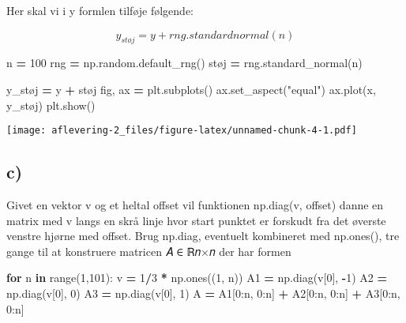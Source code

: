 \documentclass[
]{article}
\newenvironment{Shaded}{\begin{snugshade}}{\end{snugshade}}
\newcommand{\BuiltInTok}[1]{#1}
\newcommand{\ControlFlowTok}[1]{\textcolor[rgb]{0.13,0.29,0.53}{\textbf{#1}}}
\newcommand{\DecValTok}[1]{\textcolor[rgb]{0.00,0.00,0.81}{#1}}
\newcommand{\KeywordTok}[1]{\textcolor[rgb]{0.13,0.29,0.53}{\textbf{#1}}}
\newcommand{\NormalTok}[1]{#1}
\newcommand{\OperatorTok}[1]{\textcolor[rgb]{0.81,0.36,0.00}{\textbf{#1}}}
\newcommand{\StringTok}[1]{\textcolor[rgb]{0.31,0.60,0.02}{#1}}
\begin{document}
Her skal vi i y formlen tilføje følgende:

\[
y_{støj} = y + rng.standardnormal(n)
\]

\begin{Shaded}
\begin{Highlighting}[]
\NormalTok{n }\OperatorTok{=} \DecValTok{100}
\NormalTok{rng }\OperatorTok{=}\NormalTok{ np.random.default\_rng()}
\NormalTok{støj }\OperatorTok{=}\NormalTok{ rng.standard\_normal(n)}
\end{Highlighting}
\end{Shaded}

\begin{Shaded}
\begin{Highlighting}[]
\NormalTok{y\_støj }\OperatorTok{=}\NormalTok{ y }\OperatorTok{+}\NormalTok{ støj}
\NormalTok{fig, ax }\OperatorTok{=}\NormalTok{ plt.subplots()}
\NormalTok{ax.set\_aspect(}\StringTok{"equal"}\NormalTok{)}
\NormalTok{ax.plot(x, y\_støj)}
\NormalTok{plt.show()}
\end{Highlighting}
\end{Shaded}

\texttt{[image: aflevering-2\_files/figure-latex/unnamed-chunk-4-1.pdf]}

\hypertarget{c}{%
\subsection{c)}\label{c}}

Givet en vektor v og et heltal offset vil funktionen np.diag(v, offset)
danne en matrix med v langs en skrå linje hvor start punktet er forskudt
fra det øverste venstre hjørne med offset. Brug np.diag, eventuelt
kombineret med np.ones(), tre gange til at konstruere matricen 𝐴 ∈ ℝ𝑛×𝑛
der har formen

\begin{Shaded}
\begin{Highlighting}[]
\ControlFlowTok{for}\NormalTok{ n }\KeywordTok{in} \BuiltInTok{range}\NormalTok{(}\DecValTok{1}\NormalTok{,}\DecValTok{101}\NormalTok{):}
\NormalTok{  v }\OperatorTok{=} \DecValTok{1}\OperatorTok{/}\DecValTok{3} \OperatorTok{*}\NormalTok{ np.ones((}\DecValTok{1}\NormalTok{, n))}
\NormalTok{  A1 }\OperatorTok{=}\NormalTok{ np.diag(v[}\DecValTok{0}\NormalTok{], }\OperatorTok{{-}}\DecValTok{1}\NormalTok{) }
\NormalTok{  A2 }\OperatorTok{=}\NormalTok{ np.diag(v[}\DecValTok{0}\NormalTok{], }\DecValTok{0}\NormalTok{)}
\NormalTok{  A3 }\OperatorTok{=}\NormalTok{  np.diag(v[}\DecValTok{0}\NormalTok{], }\DecValTok{1}\NormalTok{)}
\NormalTok{  A }\OperatorTok{=}\NormalTok{ A1[}\DecValTok{0}\NormalTok{:n, }\DecValTok{0}\NormalTok{:n] }\OperatorTok{+}\NormalTok{ A2[}\DecValTok{0}\NormalTok{:n, }\DecValTok{0}\NormalTok{:n] }\OperatorTok{+}\NormalTok{ A3[}\DecValTok{0}\NormalTok{:n, }\DecValTok{0}\NormalTok{:n]}
\end{Highlighting}
\end{Shaded}
\end{document}
